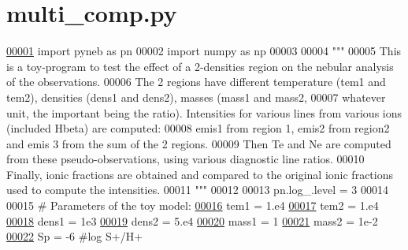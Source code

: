 \hypertarget{multi__comp_8py_source}{}\section{multi\+\_\+comp.\+py}
\label{multi__comp_8py_source}

\begin{DoxyCode}
\hypertarget{multi__comp_8py_source_l00001}{}\hyperlink{namespacepyneb_1_1test_1_1multi__comp}{00001} \textcolor{keyword}{import} pyneb \textcolor{keyword}{as} pn
00002 \textcolor{keyword}{import} numpy \textcolor{keyword}{as} np
00003 
00004 \textcolor{stringliteral}{"""}
00005 \textcolor{stringliteral}{This is a toy-program to test the effect of a 2-densities region on the nebular analysis of the
       observations.}
00006 \textcolor{stringliteral}{The 2 regions have different temperature (tem1 and tem2), densities (dens1 and dens2), masses (mass1 and
       mass2, }
00007 \textcolor{stringliteral}{whatever unit, the important being the ratio). Intensities for various lines from various ions (included
       Hbeta) are computed: }
00008 \textcolor{stringliteral}{emis1 from region 1, emis2 from region2 and emis 3 from the sum of the 2 regions.}
00009 \textcolor{stringliteral}{Then Te and Ne are computed from these pseudo-observations, using various diagnostic line ratios.}
00010 \textcolor{stringliteral}{Finally, ionic fractions are obtained and compared to the original ionic fractions used to compute the
       intensities.}
00011 \textcolor{stringliteral}{"""}
00012 
00013 pn.log\_.level = 3
00014 
00015 \textcolor{comment}{# Parameters of the toy model:}
\hypertarget{multi__comp_8py_source_l00016}{}\hyperlink{namespacepyneb_1_1test_1_1multi__comp_ab8fc3832c90b6cbaed3c320eff36daf2}{00016} tem1 = 1.e4
\hypertarget{multi__comp_8py_source_l00017}{}\hyperlink{namespacepyneb_1_1test_1_1multi__comp_ae01807adbb34e2f438764f04a898750f}{00017} tem2 = 1.e4
\hypertarget{multi__comp_8py_source_l00018}{}\hyperlink{namespacepyneb_1_1test_1_1multi__comp_a2078ba8e90b451762c3c912b5644b070}{00018} dens1 = 1e3
\hypertarget{multi__comp_8py_source_l00019}{}\hyperlink{namespacepyneb_1_1test_1_1multi__comp_a29f2b08d213d1af5d448ea758345f0a1}{00019} dens2 = 5.e4
\hypertarget{multi__comp_8py_source_l00020}{}\hyperlink{namespacepyneb_1_1test_1_1multi__comp_a0f4f1d8d7cca8ff5626b7e39261d92d5}{00020} mass1 = 1
\hypertarget{multi__comp_8py_source_l00021}{}\hyperlink{namespacepyneb_1_1test_1_1multi__comp_ad8cdd898f34b451cac9f738570b8fde6}{00021} mass2 = 1e-2
\hypertarget{multi__comp_8py_source_l00022}{}\hyperlink{namespacepyneb_1_1test_1_1multi__comp_a7dc22733a7dc31447af80b017a4366c0}{00022} Sp = -6 \textcolor{comment}{#log S+/H+}

\end{DoxyCode}
